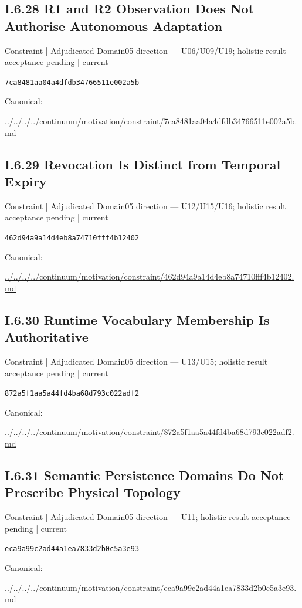 \documentclass[10pt,a4paper]{article}
\begin{document}
\subsection*{I.6.28 R1 and R2 Observation Does Not Authorise Autonomous Adaptation}
{\small Constraint | Adjudicated Domain05 direction — U06/U09/U19; holistic result acceptance pending | current}\par
\texttt{7ca8481aa04a4dfdb34766511e002a5b}\par
Canonical: \par
{\footnotesize\url{../../../../continuum/motivation/constraint/7ca8481aa04a4dfdb34766511e002a5b.md}}\par
\subsection*{I.6.29 Revocation Is Distinct from Temporal Expiry}
{\small Constraint | Adjudicated Domain05 direction — U12/U15/U16; holistic result acceptance pending | current}\par
\texttt{462d94a9a14d4eb8a74710fff4b12402}\par
Canonical: \par
{\footnotesize\url{../../../../continuum/motivation/constraint/462d94a9a14d4eb8a74710fff4b12402.md}}\par
\subsection*{I.6.30 Runtime Vocabulary Membership Is Authoritative}
{\small Constraint | Adjudicated Domain05 direction — U13/U15; holistic result acceptance pending | current}\par
\texttt{872a5f1aa5a44fd4ba68d793c022adf2}\par
Canonical: \par
{\footnotesize\url{../../../../continuum/motivation/constraint/872a5f1aa5a44fd4ba68d793c022adf2.md}}\par
\subsection*{I.6.31 Semantic Persistence Domains Do Not Prescribe Physical Topology}
{\small Constraint | Adjudicated Domain05 direction — U11; holistic result acceptance pending | current}\par
\texttt{eca9a99c2ad44a1ea7833d2b0c5a3e93}\par
Canonical: \par
{\footnotesize\url{../../../../continuum/motivation/constraint/eca9a99c2ad44a1ea7833d2b0c5a3e93.md}}\par
\end{document}
